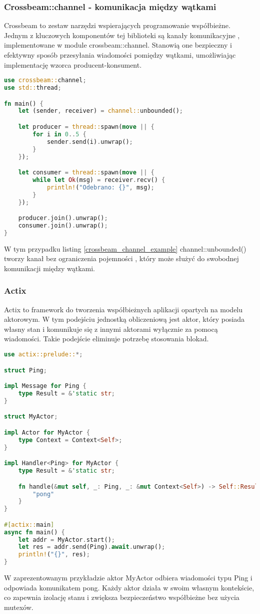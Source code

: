 \subsubsection{Crossbeam::channel - komunikacja między wątkami}
Crossbeam to zestaw narzędzi wspierających programowanie współbieżne. Jednym z kluczowych komponentów tej biblioteki są kanały komunikacyjne , implementowane w module crossbeam::channel. Stanowią one bezpieczny i efektywny sposób przesyłania wiadomości pomiędzy wątkami, umożliwiając implementację wzorca producent-konsument.

\begin{lstlisting}[language=Rust, caption=Przykład użycia kanałów Crossbeam, label=crossbeam_channel_example]
use crossbeam::channel;
use std::thread;

fn main() {
    let (sender, receiver) = channel::unbounded();

    let producer = thread::spawn(move || {
        for i in 0..5 {
            sender.send(i).unwrap();
        }
    });

    let consumer = thread::spawn(move || {
        while let Ok(msg) = receiver.recv() {
            println!("Odebrano: {}", msg);
        }
    });

    producer.join().unwrap();
    consumer.join().unwrap();
}
\end{lstlisting}
W tym przypadku listing \ref{crossbeam_channel_example} channel::unbounded() tworzy kanał bez ograniczenia pojemności , który może służyć do swobodnej komunikacji między wątkami.
\subsubsection{Actix}
Actix to framework do tworzenia współbieżnych aplikacji opartych na modelu aktorowym. W tym podejściu jednostką obliczeniową jest aktor, który posiada własny stan i komunikuje się z innymi aktorami wyłącznie za pomocą wiadomości. Takie podejście eliminuje potrzebę stosowania blokad.
\begin{lstlisting}[language=Rust, caption=Przykład użycia Actix, label=actix_example]
use actix::prelude::*;

struct Ping;

impl Message for Ping {
    type Result = &'static str;
}

struct MyActor;

impl Actor for MyActor {
    type Context = Context<Self>;
}

impl Handler<Ping> for MyActor {
    type Result = &'static str;

    fn handle(&mut self, _: Ping, _: &mut Context<Self>) -> Self::Result {
        "pong"
    }
}

#[actix::main]
async fn main() {
    let addr = MyActor.start();
    let res = addr.send(Ping).await.unwrap();
    println!("{}", res);
}
\end{lstlisting}
W zaprezentowanym przykładzie aktor MyActor odbiera wiadomości typu Ping i odpowiada komunikatem pong. Każdy aktor działa w swoim własnym kontekście, co zapewnia izolację stanu i zwiększa bezpieczeństwo współbieżne bez użycia mutexów.

